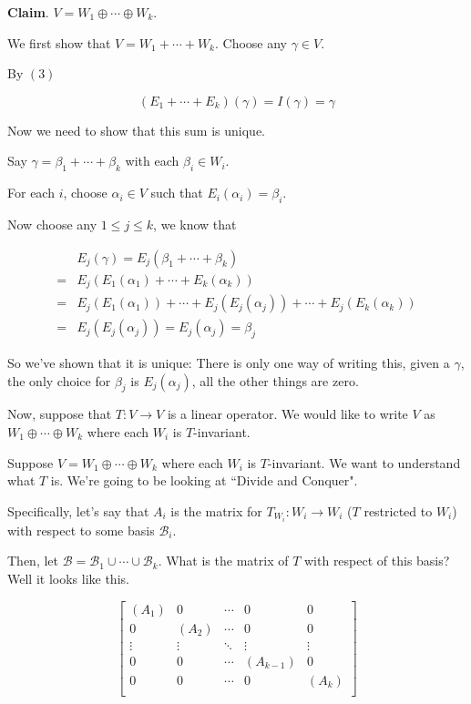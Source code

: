 \documentclass[12pt]{article}
\def\B{\mathcal B}
\begin{document}
{\begin{enumerate}[label=(\Alph*)]
        {\bf Claim}. $V = W_1 \oplus \cdots \oplus W_k$.

        We first show that $V = W_1 + \cdots + W_k$. Choose any $\gamma \in V$.

        By $(3)$

        \[
          (E_1 + \cdots + E_k)(\gamma) = I(\gamma) = \gamma
        \]

        Now we need to show that this sum is unique.

        Say $\gamma = \beta_1 + \cdots + \beta_k$ with each $\beta_i \in W_i$.

        For each $i$, choose $\alpha_i \in V$ such that $E_i(\alpha_i) =
        \beta_i$.

        Now choose any $1 \le j \le k$, we know that

        \begin{align*}
          &E_j(\gamma) = E_j(\beta_1 + \cdots + \beta_k) \\
         =&E_j(E_1(\alpha_1) + \cdots + E_k(\alpha_k)) \\
         =&E_j(E_1(\alpha_1)) + \cdots + E_j(E_j(\alpha_j)) + \cdots + E_j(E_k(\alpha_k)) \\
         =&E_j(E_j(\alpha_j)) = E_j(\alpha_j) = \beta_j
        \end{align*}

        So we've shown that it is unique: There is only one way of writing this,
        given a $\gamma$, the only choice for $\beta_j$ is $E_j(\alpha_j)$, all
        the other things are zero.

    \end{enumerate}
  }

  Now, suppose that $T: V \to V$ is a linear operator. We would like to write
  $V$ as $W_1 \oplus \cdots \oplus W_k$ where each $W_i$ is $T$-invariant.

  Suppose $V = W_1 \oplus \cdots \oplus W_k$ where each $W_i$ is $T$-invariant.
  We want to understand what $T$ is. We're going to be looking at ``Divide and
  Conquer".

  Specifically, let's say that $A_i$ is the matrix for $T_{W_i}: W_i \to W_i$
  ($T$ restricted to $W_i$) with respect to some basis $\B_i$. 

  Then, let $\B = \B_1 \cup \cdots \cup \B_k$. What is the matrix of $T$ with
  respect of this basis? Well it looks like this.

  \[
    \begin{bmatrix}
      (A_1) & 0 & \cdots & 0 & 0 \\
      0 & (A_2) & \cdots & 0 & 0 \\
      \vdots & \vdots & \ddots & \vdots & \vdots \\
      0 & 0 & \cdots & (A_{k - 1}) & 0 \\
      0 & 0 & \cdots & 0 & (A_k) \\
    \end{bmatrix}
  \]
\end{document}
